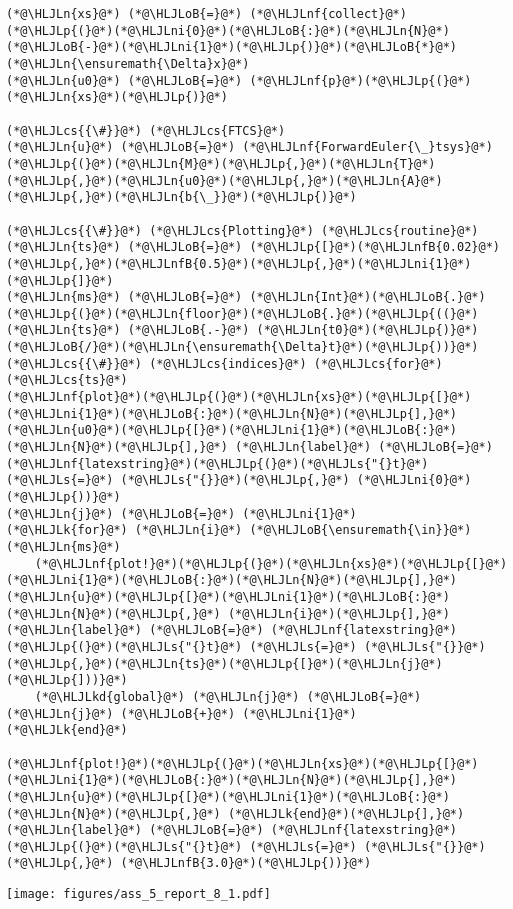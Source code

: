 \documentclass[12pt,a4paper]{article}
\newcommand{\HLJLk}[1]{\textcolor[RGB]{148,91,176}{\textbf{#1}}}
\newcommand{\HLJLkd}[1]{\textcolor[RGB]{214,102,97}{\textit{#1}}}
\newcommand{\HLJLn}[1]{#1}
\newcommand{\HLJLnf}[1]{\textcolor[RGB]{66,102,213}{#1}}
\newcommand{\HLJLs}[1]{\textcolor[RGB]{201,61,57}{#1}}
\newcommand{\HLJLnfB}[1]{\textcolor[RGB]{59,151,46}{#1}}
\newcommand{\HLJLni}[1]{\textcolor[RGB]{59,151,46}{#1}}
\newcommand{\HLJLoB}[1]{\textcolor[RGB]{102,102,102}{\textbf{#1}}}
\newcommand{\HLJLp}[1]{#1}
\newcommand{\HLJLcs}[1]{\textcolor[RGB]{153,153,119}{\textit{#1}}}
\begin{document}
\begin{lstlisting}
(*@\HLJLn{xs}@*) (*@\HLJLoB{=}@*) (*@\HLJLnf{collect}@*)(*@\HLJLp{(}@*)(*@\HLJLni{0}@*)(*@\HLJLoB{:}@*)(*@\HLJLn{N}@*)(*@\HLJLoB{-}@*)(*@\HLJLni{1}@*)(*@\HLJLp{)}@*)(*@\HLJLoB{*}@*)(*@\HLJLn{\ensuremath{\Delta}x}@*)
(*@\HLJLn{u0}@*) (*@\HLJLoB{=}@*) (*@\HLJLnf{p}@*)(*@\HLJLp{(}@*)(*@\HLJLn{xs}@*)(*@\HLJLp{)}@*)

(*@\HLJLcs{{\#}}@*) (*@\HLJLcs{FTCS}@*)
(*@\HLJLn{u}@*) (*@\HLJLoB{=}@*) (*@\HLJLnf{ForwardEuler{\_}tsys}@*)(*@\HLJLp{(}@*)(*@\HLJLn{M}@*)(*@\HLJLp{,}@*)(*@\HLJLn{T}@*)(*@\HLJLp{,}@*)(*@\HLJLn{u0}@*)(*@\HLJLp{,}@*)(*@\HLJLn{A}@*)(*@\HLJLp{,}@*)(*@\HLJLn{b{\_}}@*)(*@\HLJLp{)}@*)

(*@\HLJLcs{{\#}}@*) (*@\HLJLcs{Plotting}@*) (*@\HLJLcs{routine}@*)
(*@\HLJLn{ts}@*) (*@\HLJLoB{=}@*) (*@\HLJLp{[}@*)(*@\HLJLnfB{0.02}@*)(*@\HLJLp{,}@*)(*@\HLJLnfB{0.5}@*)(*@\HLJLp{,}@*)(*@\HLJLni{1}@*)(*@\HLJLp{]}@*)
(*@\HLJLn{ms}@*) (*@\HLJLoB{=}@*) (*@\HLJLn{Int}@*)(*@\HLJLoB{.}@*)(*@\HLJLp{(}@*)(*@\HLJLn{floor}@*)(*@\HLJLoB{.}@*)(*@\HLJLp{((}@*)(*@\HLJLn{ts}@*) (*@\HLJLoB{.-}@*) (*@\HLJLn{t0}@*)(*@\HLJLp{)}@*)(*@\HLJLoB{/}@*)(*@\HLJLn{\ensuremath{\Delta}t}@*)(*@\HLJLp{))}@*)(*@\HLJLcs{{\#}}@*) (*@\HLJLcs{indices}@*) (*@\HLJLcs{for}@*) (*@\HLJLcs{ts}@*)
(*@\HLJLnf{plot}@*)(*@\HLJLp{(}@*)(*@\HLJLn{xs}@*)(*@\HLJLp{[}@*)(*@\HLJLni{1}@*)(*@\HLJLoB{:}@*)(*@\HLJLn{N}@*)(*@\HLJLp{],}@*) (*@\HLJLn{u0}@*)(*@\HLJLp{[}@*)(*@\HLJLni{1}@*)(*@\HLJLoB{:}@*)(*@\HLJLn{N}@*)(*@\HLJLp{],}@*) (*@\HLJLn{label}@*) (*@\HLJLoB{=}@*) (*@\HLJLnf{latexstring}@*)(*@\HLJLp{(}@*)(*@\HLJLs{"{}t}@*) (*@\HLJLs{=}@*) (*@\HLJLs{"{}}@*)(*@\HLJLp{,}@*) (*@\HLJLni{0}@*) (*@\HLJLp{))}@*)
(*@\HLJLn{j}@*) (*@\HLJLoB{=}@*) (*@\HLJLni{1}@*)
(*@\HLJLk{for}@*) (*@\HLJLn{i}@*) (*@\HLJLoB{\ensuremath{\in}}@*) (*@\HLJLn{ms}@*)
    (*@\HLJLnf{plot!}@*)(*@\HLJLp{(}@*)(*@\HLJLn{xs}@*)(*@\HLJLp{[}@*)(*@\HLJLni{1}@*)(*@\HLJLoB{:}@*)(*@\HLJLn{N}@*)(*@\HLJLp{],}@*) (*@\HLJLn{u}@*)(*@\HLJLp{[}@*)(*@\HLJLni{1}@*)(*@\HLJLoB{:}@*)(*@\HLJLn{N}@*)(*@\HLJLp{,}@*) (*@\HLJLn{i}@*)(*@\HLJLp{],}@*) (*@\HLJLn{label}@*) (*@\HLJLoB{=}@*) (*@\HLJLnf{latexstring}@*)(*@\HLJLp{(}@*)(*@\HLJLs{"{}t}@*) (*@\HLJLs{=}@*) (*@\HLJLs{"{}}@*)(*@\HLJLp{,}@*)(*@\HLJLn{ts}@*)(*@\HLJLp{[}@*)(*@\HLJLn{j}@*)(*@\HLJLp{]))}@*)
    (*@\HLJLkd{global}@*) (*@\HLJLn{j}@*) (*@\HLJLoB{=}@*) (*@\HLJLn{j}@*) (*@\HLJLoB{+}@*) (*@\HLJLni{1}@*)
(*@\HLJLk{end}@*)

(*@\HLJLnf{plot!}@*)(*@\HLJLp{(}@*)(*@\HLJLn{xs}@*)(*@\HLJLp{[}@*)(*@\HLJLni{1}@*)(*@\HLJLoB{:}@*)(*@\HLJLn{N}@*)(*@\HLJLp{],}@*) (*@\HLJLn{u}@*)(*@\HLJLp{[}@*)(*@\HLJLni{1}@*)(*@\HLJLoB{:}@*)(*@\HLJLn{N}@*)(*@\HLJLp{,}@*) (*@\HLJLk{end}@*)(*@\HLJLp{],}@*) (*@\HLJLn{label}@*) (*@\HLJLoB{=}@*) (*@\HLJLnf{latexstring}@*)(*@\HLJLp{(}@*)(*@\HLJLs{"{}t}@*) (*@\HLJLs{=}@*) (*@\HLJLs{"{}}@*)(*@\HLJLp{,}@*) (*@\HLJLnfB{3.0}@*)(*@\HLJLp{))}@*)
\end{lstlisting}

\texttt{[image: figures/ass\_5\_report\_8\_1.pdf]}
\end{document}
